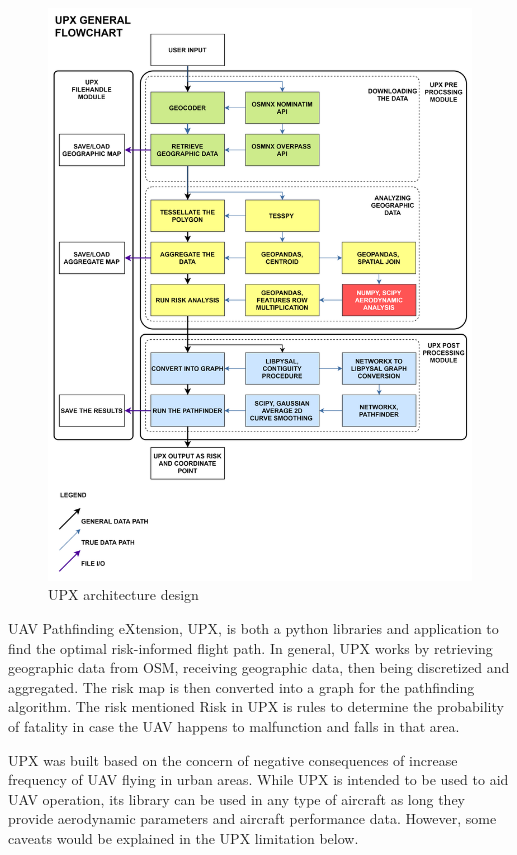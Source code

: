 \documentclass[12pt]{report}
\begin{document}
        \begin{figure}[H]
            \centering
            \includegraphics[width=\textwidth]{General Image/UPX GENERAL FLOWCHART.png}
            \caption{UPX architecture design}
            \label{fig:UPX_arch}
        \end{figure}
        
        UAV Pathfinding eXtension, UPX, is both a python libraries and application to find the optimal risk-informed
        flight path. In general, UPX works by retrieving geographic data from OSM, receiving geographic data, then being
        discretized and aggregated. The risk map is then converted into a graph for the pathfinding algorithm. The risk
        mentioned Risk in UPX is rules to determine the probability of fatality in case the UAV happens to malfunction
        and falls in that area.
            
        UPX was built based on the concern of negative consequences of increase frequency of UAV flying in urban areas.
        While UPX is intended to be used to aid UAV operation, its library can be used in any type of aircraft as long
        they provide aerodynamic parameters and aircraft performance data. However, some caveats would be explained in
        the UPX limitation below.
\end{document}
